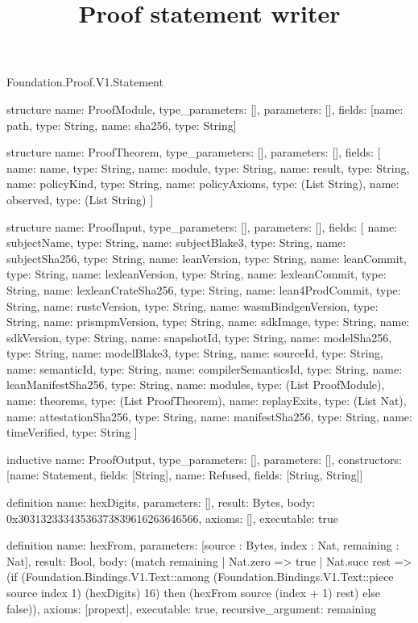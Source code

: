 \begin{lexlean}{Foundation.Proof.V1.Statement}
\title{Proof statement writer}
\begin{semanticmodule}
structure{
  name: ProofModule,
  type_parameters: [],
  parameters: [],
  fields: [{name: path, type: String}, {name: sha256, type: String}]
}

structure{
  name: ProofTheorem,
  type_parameters: [],
  parameters: [],
  fields: [
    {name: name, type: String},
    {name: module, type: String},
    {name: result, type: String},
    {name: policyKind, type: String},
    {name: policyAxioms, type: (List String)},
    {name: observed, type: (List String)}
  ]
}

structure{
  name: ProofInput,
  type_parameters: [],
  parameters: [],
  fields: [
    {name: subjectName, type: String},
    {name: subjectBlake3, type: String},
    {name: subjectSha256, type: String},
    {name: leanVersion, type: String},
    {name: leanCommit, type: String},
    {name: lexleanVersion, type: String},
    {name: lexleanCommit, type: String},
    {name: lexleanCrateSha256, type: String},
    {name: lean4ProdCommit, type: String},
    {name: rustcVersion, type: String},
    {name: wasmBindgenVersion, type: String},
    {name: prismpmVersion, type: String},
    {name: sdkImage, type: String},
    {name: sdkVersion, type: String},
    {name: snapshotId, type: String},
    {name: modelSha256, type: String},
    {name: modelBlake3, type: String},
    {name: sourceId, type: String},
    {name: semanticId, type: String},
    {name: compilerSemanticsId, type: String},
    {name: leanManifestSha256, type: String},
    {name: modules, type: (List ProofModule)},
    {name: theorems, type: (List ProofTheorem)},
    {name: replayExits, type: (List Nat)},
    {name: attestationSha256, type: String},
    {name: manifestSha256, type: String},
    {name: timeVerified, type: String}
  ]
}

inductive{
  name: ProofOutput,
  type_parameters: [],
  parameters: [],
  constructors: [{name: Statement, fields: [String]}, {name: Refused, fields: [String, String]}]
}

definition{
  name: hexDigits,
  parameters: [],
  result: Bytes,
  body: 0x30313233343536373839616263646566,
  axioms: [],
  executable: true
}

definition{
  name: hexFrom,
  parameters: [source : Bytes, index : Nat, remaining : Nat],
  result: Bool,
  body: (match remaining
    | Nat.zero => true
    | Nat.succ rest => (if (Foundation.Bindings.V1.Text::among (Foundation.Bindings.V1.Text::piece source index 1) (hexDigits) 16) then (hexFrom source (index + 1) rest) else false)),
  axioms: [propext],
  executable: true,
  recursive_argument: remaining
}


\end{semanticmodule}
\end{lexlean}
